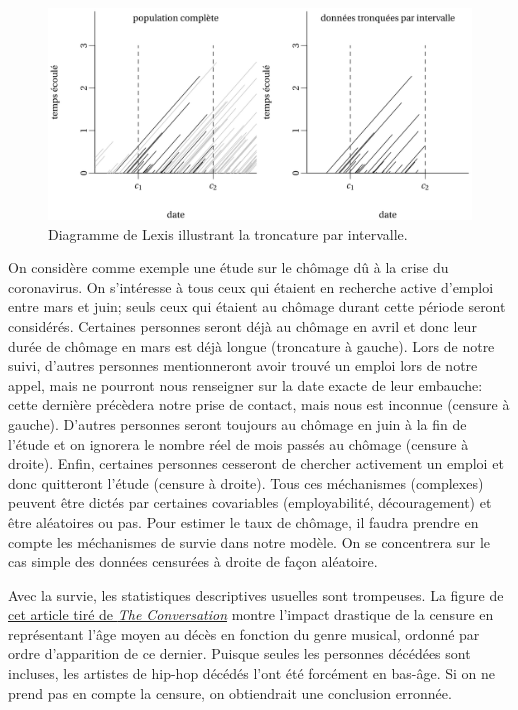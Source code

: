 \documentclass[
  11pt,
  letterpaper,
]{scrbook}
\theoremstyle{definition}
\theoremstyle{remark}
\begin{document}
\begin{figure}[ht!]

{\centering \includegraphics[width=1\textwidth,height=\textheight]{figures/lexis_troncationintervalle.png}

}

\caption{\label{fig-troncatureintervalle}Diagramme de Lexis illustrant
la troncature par intervalle.}

\end{figure}

On considère comme exemple une étude sur le chômage dû à la crise du
coronavirus. On s'intéresse à tous ceux qui étaient en recherche active
d'emploi entre mars et juin; seuls ceux qui étaient au chômage durant
cette période seront considérés. Certaines personnes seront déjà au
chômage en avril et donc leur durée de chômage en mars est déjà longue
(troncature à gauche). Lors de notre suivi, d'autres personnes
mentionneront avoir trouvé un emploi lors de notre appel, mais ne
pourront nous renseigner sur la date exacte de leur embauche: cette
dernière précèdera notre prise de contact, mais nous est inconnue
(censure à gauche). D'autres personnes seront toujours au chômage en
juin à la fin de l'étude et on ignorera le nombre réel de mois passés au
chômage (censure à droite). Enfin, certaines personnes cesseront de
chercher activement un emploi et donc quitteront l'étude (censure à
droite). Tous ces méchanismes (complexes) peuvent être dictés par
certaines covariables (employabilité, découragement) et être aléatoires
ou pas. Pour estimer le taux de chômage, il faudra prendre en compte les
méchanismes de survie dans notre modèle. On se concentrera sur le cas
simple des données censurées à droite de façon aléatoire.

Avec la survie, les statistiques descriptives usuelles sont trompeuses.
La figure de
\href{https://theconversation.com/music-to-die-for-how-genre-affects-popular-musicians-life-expectancy-36660}{cet
article tiré de \emph{The Conversation}} montre l'impact drastique de la
censure en représentant l'âge moyen au décès en fonction du genre
musical, ordonné par ordre d'apparition de ce dernier. Puisque seules
les personnes décédées sont incluses, les artistes de hip-hop décédés
l'ont été forcément en bas-âge. Si on ne prend pas en compte la censure,
on obtiendrait une conclusion erronnée.
\end{document}
